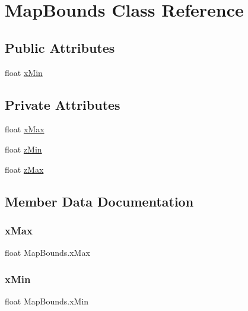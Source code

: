 \hypertarget{class_map_bounds}{}\section{Map\+Bounds Class Reference}
\label{class_map_bounds}
\subsection*{Public Attributes}
\begin{DoxyCompactItemize}
\item 
float \mbox{\hyperlink{class_map_bounds_a00d303898481a2216ef8aa6101788201}{x\+Min}}
\end{DoxyCompactItemize}
\subsection*{Private Attributes}
\begin{DoxyCompactItemize}
\item 
float \mbox{\hyperlink{class_map_bounds_a072bf7a7bd172ae41b05799223e52550}{x\+Max}}
\item 
float \mbox{\hyperlink{class_map_bounds_a10c2fbda66927f1d51dab5ac2f396b0f}{z\+Min}}
\item 
float \mbox{\hyperlink{class_map_bounds_ade583e88139ad09d8f232052c5ee2fd0}{z\+Max}}
\end{DoxyCompactItemize}


\subsection{Member Data Documentation}
\mbox{\label{class_map_bounds_a072bf7a7bd172ae41b05799223e52550}} 
\subsubsection{\texorpdfstring{x\+Max}{xMax}}
{\footnotesize\ttfamily float Map\+Bounds.\+x\+Max\hspace{0.3cm}{\ttfamily [private]}}

\mbox{\label{class_map_bounds_a00d303898481a2216ef8aa6101788201}} 
\subsubsection{\texorpdfstring{x\+Min}{xMin}}
{\footnotesize\ttfamily float Map\+Bounds.\+x\+Min}

